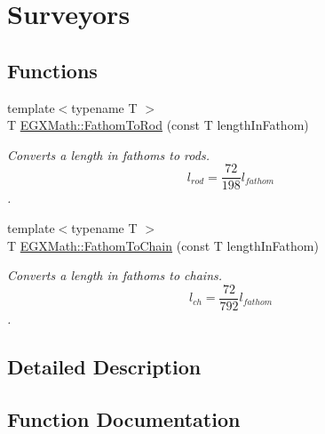 \hypertarget{group___e_g_x_math-_conversions-_length_conversions-_nautical-_fathom-_surveyors}{}\section{Surveyors}
\label{group___e_g_x_math-_conversions-_length_conversions-_nautical-_fathom-_surveyors}
\subsection*{Functions}
\begin{DoxyCompactItemize}
\item 
{\footnotesize template$<$typename T $>$ }\\T \mbox{\hyperlink{group___e_g_x_math-_conversions-_length_conversions-_nautical-_fathom-_surveyors_ga6afd3032ea722bf44ba979d3e37a2dc2}{E\+G\+X\+Math\+::\+Fathom\+To\+Rod}} (const T length\+In\+Fathom)
\begin{DoxyCompactList}\small\item\em Converts a length in fathoms to rods. \[ l_{rod}= \frac{72}{198} l_{fathom} \]. \end{DoxyCompactList}\item 
{\footnotesize template$<$typename T $>$ }\\T \mbox{\hyperlink{group___e_g_x_math-_conversions-_length_conversions-_nautical-_fathom-_surveyors_ga504644c4cd53f24ae0ce337136975acf}{E\+G\+X\+Math\+::\+Fathom\+To\+Chain}} (const T length\+In\+Fathom)
\begin{DoxyCompactList}\small\item\em Converts a length in fathoms to chains. \[ l_{ch}= \frac{72}{792} l_{fathom} \]. \end{DoxyCompactList}\end{DoxyCompactItemize}


\subsection{Detailed Description}


\subsection{Function Documentation}
\mbox{\label{group___e_g_x_math-_conversions-_length_conversions-_nautical-_fathom-_surveyors_ga504644c4cd53f24ae0ce337136975acf}} 

